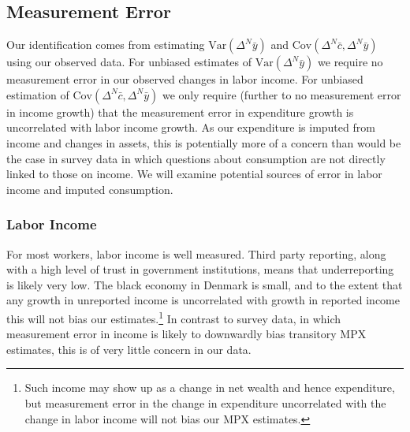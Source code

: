 \documentclass[titlepage]{\econtex}\newcommand{\texname}{ConsumptionHeterogeneity}
\begin{document}
\subsection{Measurement Error} \label{Measurement_error}
Our identification comes from estimating $\mathrm{Var}(\Delta^N \bar{y})$ and $\mathrm{Cov}(\Delta^N \bar{c},\Delta^N \bar{y})$ using our observed data. For unbiased estimates of $\mathrm{Var}(\Delta^N \bar{y})$ we require no measurement error in our observed changes in labor income. For unbiased estimation of $\mathrm{Cov}(\Delta^N \bar{c},\Delta^N \bar{y})$ we only require (further to no measurement error in income growth) that the measurement error in expenditure growth is uncorrelated with labor income growth. As our expenditure is imputed from income and changes in assets, this is potentially more of a concern than would be the case in survey data in which questions about consumption are not directly linked to those on income. We will examine potential sources of error in labor income and imputed consumption.

\subsubsection{Labor Income}
For most workers, labor income is well measured. Third party reporting, along with a high level of trust in government institutions, means that underreporting is likely very low. The black economy in Denmark is small, and to the extent that any growth in unreported income is uncorrelated with growth in reported income this will not bias our estimates.\footnote{Such income may show up as a change in net wealth and hence expenditure, but measurement error in the change in expenditure uncorrelated with the change in labor income will not bias our MPX estimates.} In contrast to survey data, in which measurement error in income is likely to downwardly bias transitory MPX estimates, this is of very little concern in our data.
\end{document}
